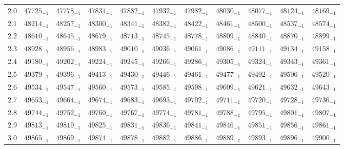 \documentclass[10pt, a4paper]{article}
\begin{document}
\begin{center}
\begin{longtable}{c || c c c c c | c c c c c}
        \hline
        2.0 & \({47725}_{-1}\) & \({47778}_{-1}\) & \({47831}_{-1}\) & \({47882}_{-1}\) & \({47932}_{-1}\) & \({47982}_{-1}\) & \({48030}_{-1}\) & \({48077}_{-1}\) & \({48124}_{-1}\) & \({48169}_{-1}\)\\
        2.1 & \({48214}_{-1}\) & \({48257}_{-1}\) & \({48300}_{-1}\) & \({48341}_{-1}\) & \({48382}_{-1}\) & \({48422}_{-1}\) & \({48461}_{-1}\) & \({48500}_{-1}\) & \({48537}_{-1}\) & \({48574}_{-1}\)\\
        2.2 & \({48610}_{-1}\) & \({48645}_{-1}\) & \({48679}_{-1}\) & \({48713}_{-1}\) & \({48745}_{-1}\) & \({48778}_{-1}\) & \({48809}_{-1}\) & \({48840}_{-1}\) & \({48870}_{-1}\) & \({48899}_{-1}\)\\
        2.3 & \({48928}_{-1}\) & \({48956}_{-1}\) & \({48983}_{-1}\) & \({49010}_{-1}\) & \({49036}_{-1}\) & \({49061}_{-1}\) & \({49086}_{-1}\) & \({49111}_{-1}\) & \({49134}_{-1}\) & \({49158}_{-1}\)\\
        2.4 & \({49180}_{-1}\) & \({49202}_{-1}\) & \({49224}_{-1}\) & \({49245}_{-1}\) & \({49266}_{-1}\) & \({49286}_{-1}\) & \({49305}_{-1}\) & \({49324}_{-1}\) & \({49343}_{-1}\) & \({49361}_{-1}\)\\
        2.5 & \({49379}_{-1}\) & \({49396}_{-1}\) & \({49413}_{-1}\) & \({49430}_{-1}\) & \({49446}_{-1}\) & \({49461}_{-1}\) & \({49477}_{-1}\) & \({49492}_{-1}\) & \({49506}_{-1}\) & \({49520}_{-1}\)\\
        2.6 & \({49534}_{-1}\) & \({49547}_{-1}\) & \({49560}_{-1}\) & \({49573}_{-1}\) & \({49585}_{-1}\) & \({49598}_{-1}\) & \({49609}_{-1}\) & \({49621}_{-1}\) & \({49632}_{-1}\) & \({49643}_{-1}\)\\
        2.7 & \({49653}_{-1}\) & \({49664}_{-1}\) & \({49674}_{-1}\) & \({49683}_{-1}\) & \({49693}_{-1}\) & \({49702}_{-1}\) & \({49711}_{-1}\) & \({49720}_{-1}\) & \({49728}_{-1}\) & \({49736}_{-1}\)\\
        2.8 & \({49744}_{-1}\) & \({49752}_{-1}\) & \({49760}_{-1}\) & \({49767}_{-1}\) & \({49774}_{-1}\) & \({49781}_{-1}\) & \({49788}_{-1}\) & \({49795}_{-1}\) & \({49801}_{-1}\) & \({49807}_{-1}\)\\
        2.9 & \({49813}_{-1}\) & \({49819}_{-1}\) & \({49825}_{-1}\) & \({49831}_{-1}\) & \({49836}_{-1}\) & \({49841}_{-1}\) & \({49846}_{-1}\) & \({49851}_{-1}\) & \({49856}_{-1}\) & \({49861}_{-1}\)\\
        \hline
        3.0 & \({49865}_{-1}\) & \({49869}_{-1}\) & \({49874}_{-1}\) & \({49878}_{-1}\) & \({49882}_{-1}\) & \({49886}_{-1}\) & \({49889}_{-1}\) & \({49893}_{-1}\) & \({49896}_{-1}\) & \({49900}_{-1}\)\\

\end{longtable}
\end{center}
\end{document}
